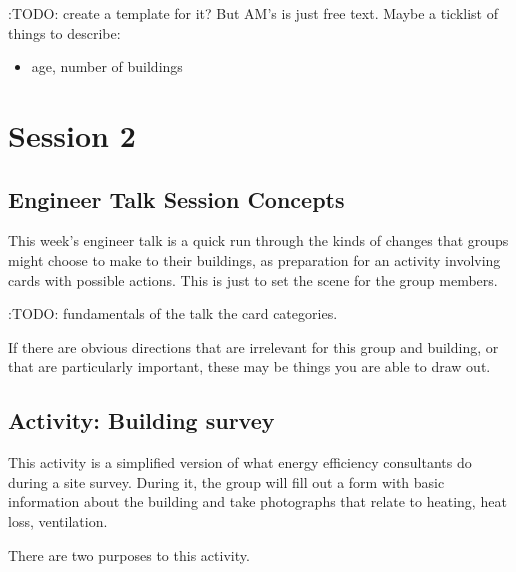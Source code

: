 \documentclass[letterpaper,10pt,english]{jupyterBook}
\begin{document}
\sphinxAtStartPar
:TODO: create a template for it?  But AM’s is just free text.  Maybe a ticklist of things to describe:
\begin{itemize}
\item {} 
\sphinxAtStartPar
age, number of buildings

\end{itemize}

\sphinxstepscope


\chapter{Session 2}
\label{\detokenize{session2/session2:session-2}}\label{\detokenize{session2/session2::doc}}
\sphinxstepscope


\section{Engineer Talk \sphinxhyphen{} Session Concepts}
\label{\detokenize{session2/details/session-concepts:engineer-talk-session-concepts}}\label{\detokenize{session2/details/session-concepts::doc}}
\sphinxAtStartPar
This week’s engineer talk is a quick run through the kinds of changes that groups might choose to make to their buildings, as preparation for an activity involving cards with possible actions.  This is just to set the scene for the group members.

\sphinxAtStartPar
:TODO: fundamentals of the talk \sphinxhyphen{} the card categories.

\sphinxAtStartPar
If there are obvious directions that are irrelevant for this group and building, or that are particularly important, these may be things you are able to draw out.

\sphinxstepscope


\section{Activity:  Building survey}
\label{\detokenize{session2/details/activity:activity-building-survey}}\label{\detokenize{session2/details/activity::doc}}
\sphinxAtStartPar
This activity is a simplified version of what energy efficiency consultants do during a site survey. During it, the group will fill out a form with basic information about the building and take photographs that relate to heating, heat loss, ventilation.

\sphinxAtStartPar
There are two purposes to this activity.
\end{document}
